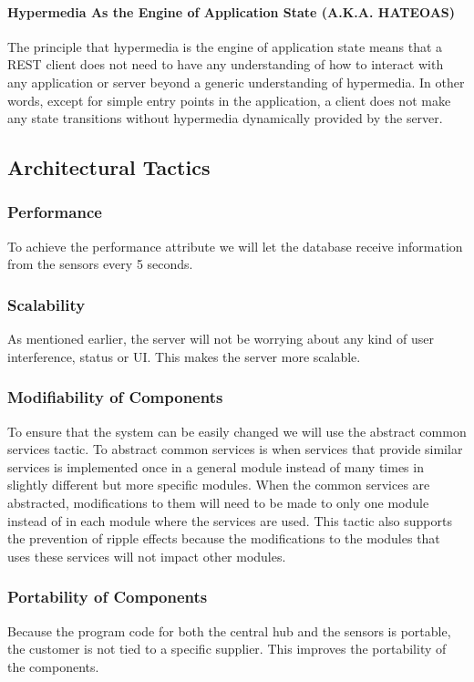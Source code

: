 \documentclass[../document.tex]{subfiles}
\begin{document}
\paragraph{Hypermedia As the Engine of Application State (A.K.A. HATEOAS)}
The principle that hypermedia is the engine of application state means that a \gls{REST} client does not need to have any understanding of how to interact with any application or server beyond a generic understanding of hypermedia. In other words, except for simple entry points in the application, a client does not make any state transitions without hypermedia dynamically provided by the server. 

\subsection{Architectural Tactics}
\subsubsection{Performance}
To achieve the performance attribute we will let the database receive information from the sensors every 5 seconds. 

\subsubsection{Scalability}
As mentioned earlier, the server will not be worrying about any kind of user interference, status or UI. This makes the server more scalable.

\subsubsection{Modifiability of Components}
To ensure that the system can be easily changed we will use the abstract common services tactic. To abstract common services is when services that provide similar services is implemented once in a general module instead of many times in slightly different but more specific modules. When the common services are abstracted, modifications to them will need to be made to only one module instead of in each module where the services are used. This tactic also supports the prevention of ripple effects because the modifications to the modules that uses these services will not impact other modules.

\subsubsection{Portability of Components}
Because the program code for both the central hub and the sensors is portable, the customer is not tied to a specific supplier. This improves the portability of the components.
\end{document}
